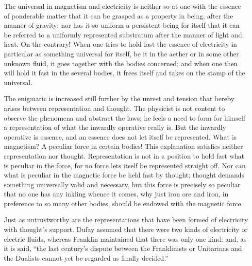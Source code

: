 \documentclass[12pt,a4paper]{book}
\begin{document}
The universal in magnetism and electricity is neither so at one with the essence of ponderable matter that it can be
grasped as a property in being, after the manner of gravity; nor has it so uniform a persistent being for itself that it
can be referred to a uniformly represented substratum after the manner of light and heat. On the contrary! When one tries
to hold fast the essence of electricity in particular as something universal for itself, be it in the aether or in some
other
unknown fluid, it goes together with the bodies concerned; and when one then will hold it fast in the several bodies, it
frees itself and takes on the stamp of the universal.

The enigmatic is increased still further by the unrest and tension that hereby arises between representation and thought.
The physicist is not content to observe the phenomena and abstract the laws; he feels a need to form for himself a
representation of what the inwardly operative really is. But the inwardly operative is essence, and an essence does not
let itself be represented. What is magnetism? A peculiar force in certain bodies! This explanation satisfies neither
representation nor thought. Representation is not in a position to hold fast what is peculiar in the force, for no force
lets itself be represented straight off. Nor can what is peculiar in the magnetic force be held fast by thought; thought
demands something universally valid and necessary, but this force is precisely so peculiar that no one has any inkling
whence it comes, why just iron ore and iron, in preference to so many other bodies, should be endowed with the magnetic
force.

Just as untrustworthy are the representations that have been formed of electricity with thought's support. Dufay assumed
that there were two kinds of electricity or electric fluids, whereas Franklin maintained that there was only one kind;
and, as it is said, ``the last century's dispute between the Franklinists or Unitarians and the Dualists cannot yet be
regarded as finally decided.''
\end{document}
